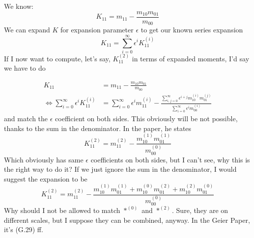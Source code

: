 \documentclass{article}
\begin{document}
We know:
\begin{equation}
  K_{11} = m_{11} - \frac{m_{10}m_{01}}{m_{00}}
\end{equation}
We can expand $K$ for expansion parameter $\epsilon$ to get our known series expansion
\begin{equation}
  K_{11} = \sum_{i=0}^\infty \epsilon^i K_{11}^{(i)}
\end{equation}
If I now want to compute, let's say, $K_{11}^{(2)}$ in terms of expanded moments, I'd say we have to do

\begin{equation}
  \begin{aligned}
    K_{11} & = m_{11} - \frac{m_{10}m_{01}}{m_{00}}\\
    \Leftrightarrow
    \sum_{i=0}^\infty \epsilon^i K_{11}^{(i)}
    & = \sum_{i=0}^\infty \epsilon^i m_{11}^{(i)} -
    \frac{\sum_{i,j=0}^\infty \epsilon^{i+j} m_{10}^{(i)}m_{01}^{(j)}}
         {\sum_{i=0}^\infty \epsilon^i m_{00}^{(i)}}
  \end{aligned}
\end{equation}
and match the $\epsilon$ coefficient on both sides. This obviously will be not possible, thanks to the sum in the denominator.
In the paper, he states
\begin{equation}
  K_{11}^{(2)}
  = m_{11}^{(2)} -
  \frac{m_{10}^{(1)}m_{01}^{(1)}}
       {m_{00}^{(0)}}
\end{equation}
Which obviously has same $\epsilon$ coefficients on both sides, but I can't see, why this is the right way to do it?
If we just ignore the sum in the denominator, I would suggest the expansion to be
\begin{equation}
  K_{11}^{(2)}
  = m_{11}^{(2)} -
  \frac{m_{10}^{(1)}m_{01}^{(1)}+m_{10}^{(0)}m_{01}^{(2)}+m_{10}^{(2)}m_{01}^{(0)}}
       {m_{00}^{(0)}}
\end{equation}
Why should I not be allowed to match $*^{(0)}$ and $*^{(2)}$. Sure, they are on different scales, but I suppose they can be combined, anyway.
In the Geier Paper, it's (G.29) ff.
\end{document}
